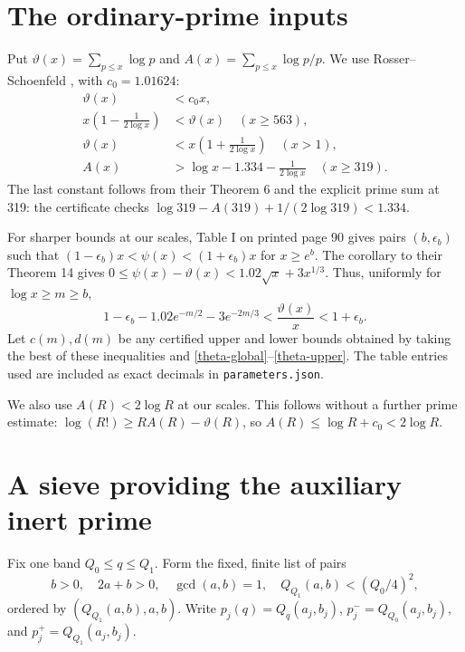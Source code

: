 \documentclass[11pt]{article}
\begin{document}
\section{The ordinary-prime inputs}
Put \(\vartheta(x)=\sum_{p\le x}\log p\) and
\(A(x)=\sum_{p\le x}\log p/p\). We use Rosser--Schoenfeld
\cite{rs}, with \(c_0=1.01624\):
\begin{align}
 \vartheta(x)&<c_0x,\label{theta-global}\\
 x\left(1-\frac1{2\log x}\right)&<\vartheta(x)
       \quad(x\ge563),\label{theta-lower}\\
 \vartheta(x)&<x\left(1+\frac1{2\log x}\right)\quad(x>1),\label{theta-upper}\\
 A(x)&>\log x-1.334-\frac1{2\log x}\quad(x\ge319).
 \label{mertens}
\end{align}
The last constant follows from their Theorem 6 and the explicit prime
sum at 319: the certificate checks
\(\log319-A(319)+1/(2\log319)<1.334\).

For sharper bounds at our scales, Table I on printed page 90 gives
pairs \((b,\epsilon_b)\) such that
\((1-\epsilon_b)x<\psi(x)<(1+\epsilon_b)x\) for \(x\ge e^b\).
The corollary to their Theorem 14 gives
\(0\le\psi(x)-\vartheta(x)<1.02\sqrt x+3x^{1/3}\).
Thus, uniformly for \(\log x\ge m\ge b\),
\begin{equation}\label{tabletheta}
 1-\epsilon_b-1.02e^{-m/2}-3e^{-2m/3}
 <\frac{\vartheta(x)}x<1+\epsilon_b.
\end{equation}
Let \(c(m),d(m)\) be any certified upper and lower bounds obtained
by taking the best of these inequalities and
\eqref{theta-global}--\eqref{theta-upper}. The table entries used are
included as exact decimals in \texttt{parameters.json}.

We also use \(A(R)<2\log R\) at our scales. This follows without a
further prime estimate: \(\log(R!)\ge RA(R)-\vartheta(R)\), so
\(A(R)\le\log R+c_0<2\log R\).

\section{A sieve providing the auxiliary inert prime}\label{sieve}
Fix one band \(Q_0\le q\le Q_1\). Form the fixed, finite list of pairs
\begin{equation}\label{normlist}
 b>0,\quad 2a+b>0,\quad \gcd(a,b)=1,\quad
 Q_{Q_1}(a,b)<(Q_0/4)^2,
\end{equation}
ordered by \((Q_{Q_1}(a,b),a,b)\). Write \(p_j(q)=Q_q(a_j,b_j)\),
\(p_j^-=Q_{Q_0}(a_j,b_j)\), and \(p_j^+=Q_{Q_1}(a_j,b_j)\).
\end{document}
